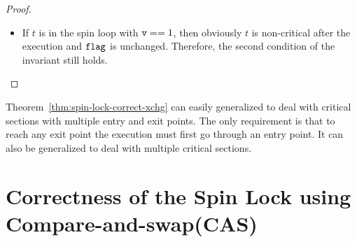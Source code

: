 \documentclass{article}[10pt]
\newcommand{\kwd}[1]{\ensuremath{\text{\ttfamily #1}}\xspace}
\def\kflag{\kwd{flag}}
\def\kv{\kwd{v}}
\begin{document}
\begin{proof}
\begin{itemize}
\begin{itemize}
\begin{itemize}
      \end{itemize}

      \item If $t$ is in the spin loop with $\kv == 1$, then obviously
        $t$ is non-critical after the execution and $\kflag$ is
        unchanged. Therefore, the second condition of the invariant
        still holds.
    \end{itemize}
  \end{itemize}
\end{proof}

Theorem~\ref{thm:spin-lock-correct-xchg} can easily generalized to deal
with critical sections with multiple entry and exit points. The only
requirement is that to reach any exit point the execution must first
go through an entry point. It can also be generalized to deal with
multiple critical sections.


\section{Correctness of the Spin Lock using Compare-and-swap(CAS)}
\label{sec:spin-lock-cas}
\end{document}
